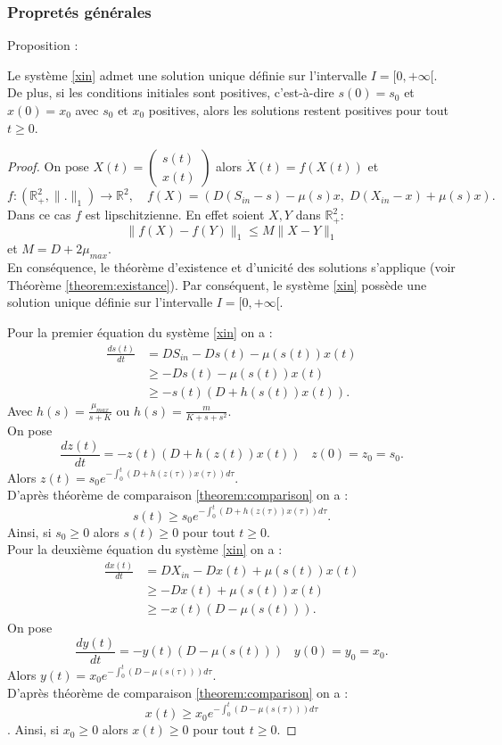 \documentclass[12pt,a4paper]{report}%
\newcounter{proposition}[section] %
\newenvironment{Proposition}[2][]
  {\refstepcounter{proposition}%
  \begin{bclogo}[
    logo=\bcplume,
    couleur=aliceblue,
    arrondi=0.1,
    barre = snake ,
    couleurBord=white,#1]{Proposition \theproposition: #2}
  }
  {\end{bclogo}}
\newcounter{Prop}[section] %
\begin{document}
\subsubsection{Propretés générales}
\begin{Proposition}{}
Le système \eqref{xin} admet une solution unique définie sur l'intervalle \(I=[0,+\infty[\). De plus, si les conditions initiales sont positives, c'est-à-dire \(s(0) = s_0\) et \(x(0) = x_0\) avec \(s_0\) et \(x_0\) positives, alors les solutions restent positives pour tout \(t \geq 0\).
\end{Proposition} 
\begin{proof}
On pose $X(t)=\begin{pmatrix} 
 s(t) \\ 
 x(t)  
 \end{pmatrix}$ alors \(\dot{X}(t)=f(X(t))\) et
$$
 f : (\mathbb{R}^2_+, \|.\|_{1}) \rightarrow \mathbb{R}^2, \quad f(X) =\left( D \left(S_{in}-s\right) - \mu(s)x ,\; D \left(X_{in}-x\right) + \mu(s)x \right).
$$
Dans ce cas $f$ est lipschitzienne. En effet soient $X, Y$ dans $\mathbb{R}^2_+$:
$$
\parallel f(X)-f(Y)\parallel_{1}\leq M \parallel X-Y\parallel_{1}
$$
et $M=D+2\mu_{max}$.\\
En conséquence, le théorème d'existence et d'unicité des solutions s'applique (voir Théorème \ref{theorem:existance}). Par conséquent, le système \eqref{xin} possède une solution unique définie sur l'intervalle \(I=[0,+\infty[\).

Pour la premier équation du système \eqref{xin} on a :
$$
\begin{aligned}
\frac{d s(t)}{d t} & =D S_{in}-Ds(t)-\mu(s(t))x(t) \\
& \geq -Ds(t)-\mu(s(t))x(t)\\
& \geq -s(t) \left( D+h(s(t))x(t)\right).
\end{aligned}
$$
Avec $h(s)= \frac{\mu_{max}}{s+K}$ ou $h(s)= \frac{m}{K+s+s^2}$.\\
On pose 
$$
 \frac{d z(t)}{d t}=-z(t) \left( D+h(z(t))x(t)\right) \;\;\; z(0)=z_0=s_0.
$$
Alors $z(t)=s_0 e^{-\int_0^t\left( D+h(z(\tau))x(\tau)\right)d\tau}$.\\
D'après théorème de comparaison \ref{theorem:comparison} on a :
$$
s(t) \geq s_0 e^{-\int_0^t\left( D+h(z(\tau))x(\tau)\right)d\tau}.
$$
Ainsi, si $s_0 \geq 0$ alors  $s(t) \geq 0$ pour tout $t \geq 0$.\\
Pour la deuxième équation du système \eqref{xin} on a :
$$
\begin{aligned}
\frac{d x(t)}{d t} & =D X_{in}-Dx(t)+\mu(s(t))x(t) \\
& \geq -Dx(t)+\mu(s(t))x(t)\\
& \geq -x(t) \left( D-\mu(s(t))\right).
\end{aligned}
$$
On pose 
$$
 \frac{d y(t)}{d t}=-y(t)\left( D-\mu(s(t))\right) \;\;\; y(0)=y_0=x_0.
$$
Alors $y(t)=x_0 e^{-\int_0^t\left( D-\mu(s(\tau))\right)d\tau}$.\\
D'après théorème de comparaison \ref{theorem:comparison} on a :
$$
x(t) \geq x_0 e^{-\int_0^t\left( D-\mu(s(\tau))\right)d\tau}
$$.
Ainsi, si $x_0 \geq 0$ alors $x(t) \geq 0$ pour tout $t \geq 0$.

\end{proof}
\end{document}
